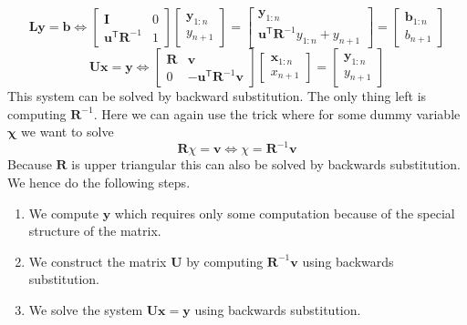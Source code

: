 \documentclass{article}
\begin{document}
\begin{equation*}
    \mathbf{L}\mathbf{y} = \mathbf{b} \Longleftrightarrow \begin{bmatrix}
        \mathbf{I} & 0 \\
        \mathbf{u}^{\mathsf{T}}\mathbf{R}^{-1} & 1
    \end{bmatrix}\begin{bmatrix}
        \mathbf{y}_{1:n} \\y_{n + 1}
    \end{bmatrix} = 
    \begin{bmatrix}
        \mathbf{y}_{1:n} \\
        \mathbf{u}^{\mathsf{T}}\mathbf{R}^{-1}y_{1:n} + y_{n +1}
    \end{bmatrix}
    =
    \begin{bmatrix}
        \mathbf{b}_{1:n} \\b_{n +1}
    \end{bmatrix}
\end{equation*}
\begin{equation*}
    \mathbf{U}\mathbf{x} = \mathbf{y} \Longleftrightarrow \begin{bmatrix}
        \mathbf{R} & \mathbf{v} \\
        0 &  - \mathbf{u}^{\mathsf{T}}\mathbf{R}^{-1}\mathbf{v}
    \end{bmatrix}\begin{bmatrix}
        \mathbf{x}_{1:n} \\ x_{n +1}
    \end{bmatrix} = 
    \begin{bmatrix}
        \mathbf{y}_{1:n} \\
        y_{n +1}
    \end{bmatrix}
\end{equation*}
This system can be solved by backward substitution. The only thing left is computing $\mathbf{R}^{-1}$. Here we can again use the trick where for some dummy variable $\mathbf{\chi}$ we want to solve
\begin{equation*}
    \mathbf{R}\chi = \mathbf{v} \Longleftrightarrow  \chi = \mathbf{R}^{-1}\mathbf{v}
\end{equation*}
Because $\mathbf{R}$ is upper triangular this can also be solved by backwards substitution. We hence do the following steps.
\begin{enumerate}
    \item We compute $\mathbf{y}$ which requires only some computation because of the special structure of the matrix.
    \item We construct the matrix $\mathbf{U}$ by computing $\mathbf{R}^{-1}\mathbf{v}$ using backwards substitution.
    \item We solve the system $\mathbf{U}\mathbf{x} = \mathbf{y}$ using backwards substitution.
\end{enumerate}
\end{document}
